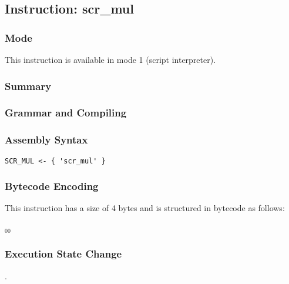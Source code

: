 \subsection{Instruction: scr\_mul}

\subsubsection{Mode}
This instruction is available in mode 1 (script interpreter).
\subsubsection{Summary}


\subsubsection{Grammar and Compiling}


\subsubsection{Assembly Syntax}

\begin{myquote}
\begin{verbatim}
SCR_MUL <- { 'scr_mul' }
\end{verbatim}
\end{myquote}

\subsubsection{Bytecode Encoding}

This instruction has a size of 4 bytes and is structured in bytecode as follows:

$_{00}$\ 

\subsubsection{Execution State Change}

.



